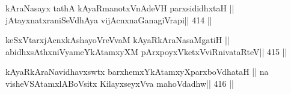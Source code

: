 \begin{shl}
kAraNasayx tathA kAyaRmanotxV\s nAdeVH parxsididhxtaH ||
jAtayxnatxraniSeVdhAya vijAcnxnaGanagiVrapi\hfill || 414 ||
\end{shl}

\begin{shl}
keSxVtarxjAcnxkAshayoVreVvaM kAyaRkAraNasaMgatiH ||
abidhxsAthxniVyameYkAtamxyXM pArxpoyxVketxVviRnivataRteV\hfill || 415 ||
\end{shl}

\begin{shl}
kAyaRkAraNavidhavxswtx barxhemxYkAtamxyXparxboVdhataH ||
na visheVSAtamxlABoV\s sitx KilayxseyxVva mahoVdadhw\hfill || 416 ||
\end{shl}


